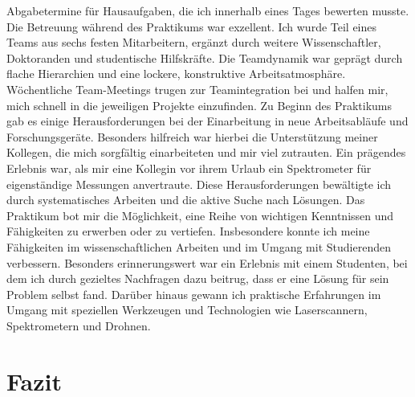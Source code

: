 \documentclass[12pt,a4paper]{report}
\begin{document}
Abgabetermine für Hausaufgaben, die ich innerhalb eines Tages bewerten
musste.
Die Betreuung während des Praktikums war exzellent. Ich wurde Teil eines Teams
aus sechs festen Mitarbeitern, ergänzt durch weitere Wissenschaftler,
Doktoranden und studentische Hilfskräfte. Die Teamdynamik war geprägt durch
flache Hierarchien und eine lockere, konstruktive Arbeitsatmosphäre.
Wöchentliche Team-Meetings trugen zur Teamintegration bei und halfen mir, mich
schnell in die jeweiligen Projekte einzufinden.
Zu Beginn des Praktikums gab es einige Herausforderungen bei der Einarbeitung
in neue Arbeitsabläufe und Forschungsgeräte. Besonders hilfreich war hierbei
die Unterstützung meiner Kollegen, die mich sorgfältig einarbeiteten und mir
viel zutrauten. Ein prägendes Erlebnis war, als mir eine Kollegin vor ihrem
Urlaub ein Spektrometer für eigenständige Messungen anvertraute. Diese
Herausforderungen bewältigte ich durch systematisches Arbeiten und die aktive
Suche nach Lösungen.
Das Praktikum bot mir die Möglichkeit, eine Reihe von wichtigen Kenntnissen und
Fähigkeiten zu erwerben oder zu vertiefen. Insbesondere konnte ich meine
Fähigkeiten im wissenschaftlichen Arbeiten und im Umgang mit Studierenden
verbessern. Besonders erinnerungswert war ein Erlebnis mit einem Studenten, bei
dem ich durch gezieltes Nachfragen dazu beitrug, dass er eine Lösung für sein
Problem selbst fand. Darüber hinaus gewann ich praktische Erfahrungen im Umgang
mit speziellen Werkzeugen und Technologien wie Laserscannern, Spektrometern und
Drohnen.

\chapter{Fazit}
\end{document}
